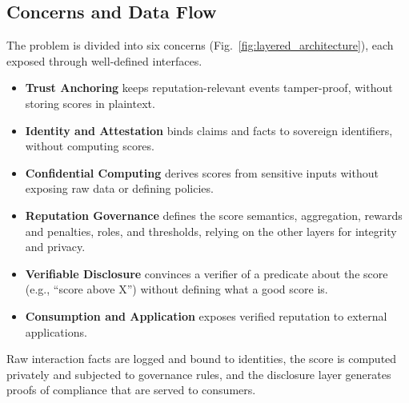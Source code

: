 \documentclass[conference]{IEEEtran}
\begin{document}
\subsection{Concerns and Data Flow}
The problem is divided into six concerns (Fig.~\ref{fig:layered_architecture}), each exposed through well-defined interfaces.
\begin{itemize}
    \item \textbf{Trust Anchoring} keeps reputation-relevant events tamper-proof, without storing scores in plaintext.
    \item \textbf{Identity and Attestation} binds claims and facts to sovereign identifiers, without computing scores.
    \item \textbf{Confidential Computing} derives scores from sensitive inputs without exposing raw data or defining policies.
    \item \textbf{Reputation Governance} defines the score semantics, aggregation, rewards and penalties, roles, and thresholds, relying on the other layers for integrity and privacy.
    \item \textbf{Verifiable Disclosure} convinces a verifier of a predicate about the score (e.g., ``score above X'') without defining what a good score is.
    \item \textbf{Consumption and Application} exposes verified reputation to external applications.
\end{itemize}
Raw interaction facts are logged and bound to identities, the score is computed privately and subjected to governance rules, and the disclosure layer generates proofs of compliance that are served to consumers.
\end{document}
